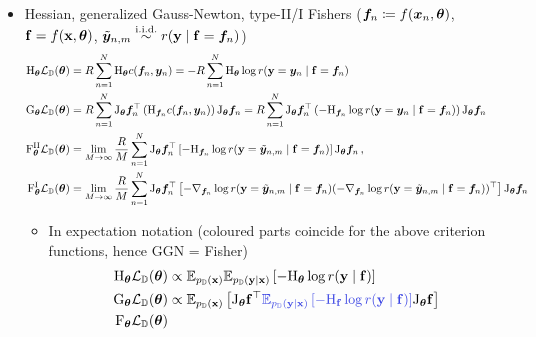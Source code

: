 \begin{itemize}
\item Hessian, generalized Gauss-Newton, type-II/I Fishers (${\bm{f}}_n \coloneq f({\bm{x}}_n, {\bm{\theta}})$, ${\mathbf{f}} = f({\mathbf{x}}, {\bm{\theta}})$, $\tilde{{\bm{y}}}_{n,m} \stackrel{\text{i.i.d.}}{\sim} r({\mathbf{y}} \mid {\mathbf{f}} = {\bm{f}}_n)$)
  \begin{align*}
    \mathrm{H}_{{\bm{\theta}}} {\mathcal{L}}_{{\mathbb{D}}}({\bm{\theta}})
    &= R \sum_{n=1}^N \mathrm{H}_{{\bm{\theta}}} c({\bm{f}}_n, {\bm{y}}_n)
      = -R \sum_{n=1}^N \mathrm{H}_{{\bm{\theta}}} \log r({\mathbf{y}} = {\bm{y}}_n \mid {\mathbf{f}} = {\bm{f}}_n)
    \\
    \mathrm{G}_{{\bm{\theta}}}{\mathcal{L}}_{{\mathbb{D}}}({\bm{\theta}})
    &= R \sum_{n=1}^N
      \mathrm{J}_{{\bm{\theta}}} {\bm{f}}_n^{\top}
      \left(
      \mathrm{H}_{{\bm{f}}_n} c({\bm{f}}_n, {\bm{y}}_n)
      \right)
      \mathrm{J}_{{\bm{\theta}}} {\bm{f}}_n
      =
      R \sum_{n=1}^N
      \mathrm{J}_{{\bm{\theta}}} {\bm{f}}_n^{\top}
      \left(
      -\mathrm{H}_{{\bm{f}}_n} \log r({\mathbf{y}} = {\bm{y}}_n \mid {\mathbf{f}} = {\bm{f}}_n)
      \right)
      \mathrm{J}_{{\bm{\theta}}} {\bm{f}}_n
    \\
    \mathrm{F}^{\text{II}}_{{\bm{\theta}}} {\mathcal{L}}_{{\mathbb{D}}}({\bm{\theta}})
    &=
      \lim_{M \to \infty}
      \frac{R}{M}
      \sum_{n=1}^N
      \mathrm{J}_{{\bm{\theta}}} {\bm{f}}_n^{\top}
      \left[
      -\mathrm{H}_{{\bm{f}}_n} \log r({\mathbf{y}} = \tilde{{\bm{y}}}_{n,m} \mid {\mathbf{f}} = {\bm{f}}_n)
      \right]
      \mathrm{J}_{{\bm{\theta}}} {\bm{f}}_n\,,
    \\
    \mathrm{F}^{\text{I}}_{{\bm{\theta}}} {\mathcal{L}}_{{\mathbb{D}}}({\bm{\theta}})
    &=
      \lim_{M \to \infty}
      \frac{R}{M}
      \sum_{n=1}^N
      \mathrm{J}_{{\bm{\theta}}} {\bm{f}}_n^{\top}
      \left[
      -\nabla_{{\bm{f}}_n} \log r({\mathbf{y}} = \tilde{{\bm{y}}}_{n,m} \mid {\mathbf{f}} = {\bm{f}}_n)
      (-\nabla_{{\bm{f}}_n} \log r({\mathbf{y}} = \tilde{{\bm{y}}}_{n,m} \mid {\mathbf{f}} = {\bm{f}}_n))^{\top}
      \right]
      \mathrm{J}_{{\bm{\theta}}} {\bm{f}}_n
  \end{align*}
  \begin{itemize}
  \item In expectation notation (coloured parts coincide for the above criterion functions, hence GGN = Fisher)
    \begin{align*}
      \hess_{\vtheta} \gL_{\sD}(\vtheta)
      &\propto
        \E_{p_{\sD}(\rvx)}
        \E_{p_{\sD}(\rvy \mid \rvx)}
        \left[
        -\hess_{\vtheta} \log r(\rvy \mid \rvf)
        \right]
      \\
      \ggn_{\vtheta}\gL_{\sD}(\vtheta)
      &\propto
        \E_{p_{\sD}(\rvx)}
        \left[
        \jac_{\vtheta} \rvf^{\top}
        \textcolor{VectorBlue}{
        \E_{p_{\sD}(\rvy \mid \rvx)}
        \left[
        -\hess_{\rvf} \log r(\rvy \mid \rvf)
        \right]
        }
        \jac_{\vtheta} \rvf
        \right]
      \\
      \fisher_{\vtheta} \gL_{\sD}(\vtheta)

\end{align*}
\end{itemize}
\end{itemize}
